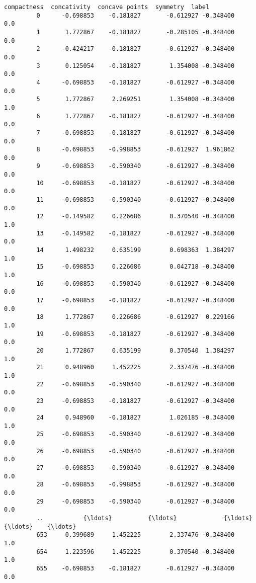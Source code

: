 \documentclass[11pt]{article}
\begin{document}
\begin{Verbatim}[commandchars=\\\{\}]
              compactness  concativity  concave points  symmetry  label  
         0      -0.698853    -0.181827       -0.612927 -0.348400    0.0  
         1       1.772867    -0.181827       -0.285105 -0.348400    0.0  
         2      -0.424217    -0.181827       -0.612927 -0.348400    0.0  
         3       0.125054    -0.181827        1.354008 -0.348400    0.0  
         4      -0.698853    -0.181827       -0.612927 -0.348400    0.0  
         5       1.772867     2.269251        1.354008 -0.348400    1.0  
         6       1.772867    -0.181827       -0.612927 -0.348400    0.0  
         7      -0.698853    -0.181827       -0.612927 -0.348400    0.0  
         8      -0.698853    -0.998853       -0.612927  1.961862    0.0  
         9      -0.698853    -0.590340       -0.612927 -0.348400    0.0  
         10     -0.698853    -0.181827       -0.612927 -0.348400    0.0  
         11     -0.698853    -0.590340       -0.612927 -0.348400    0.0  
         12     -0.149582     0.226686        0.370540 -0.348400    1.0  
         13     -0.149582    -0.181827       -0.612927 -0.348400    0.0  
         14      1.498232     0.635199        0.698363  1.384297    1.0  
         15     -0.698853     0.226686        0.042718 -0.348400    1.0  
         16     -0.698853    -0.590340       -0.612927 -0.348400    0.0  
         17     -0.698853    -0.181827       -0.612927 -0.348400    0.0  
         18      1.772867     0.226686       -0.612927  0.229166    1.0  
         19     -0.698853    -0.181827       -0.612927 -0.348400    0.0  
         20      1.772867     0.635199        0.370540  1.384297    1.0  
         21      0.948960     1.452225        2.337476 -0.348400    1.0  
         22     -0.698853    -0.590340       -0.612927 -0.348400    0.0  
         23     -0.698853    -0.181827       -0.612927 -0.348400    0.0  
         24      0.948960    -0.181827        1.026185 -0.348400    1.0  
         25     -0.698853    -0.590340       -0.612927 -0.348400    0.0  
         26     -0.698853    -0.590340       -0.612927 -0.348400    0.0  
         27     -0.698853    -0.590340       -0.612927 -0.348400    0.0  
         28     -0.698853    -0.998853       -0.612927 -0.348400    0.0  
         29     -0.698853    -0.590340       -0.612927 -0.348400    0.0  
         ..           {\ldots}          {\ldots}             {\ldots}       {\ldots}    {\ldots}  
         653     0.399689     1.452225        2.337476 -0.348400    1.0  
         654     1.223596     1.452225        0.370540 -0.348400    1.0  
         655    -0.698853    -0.181827       -0.612927 -0.348400    0.0  

\end{Verbatim}
\end{document}
